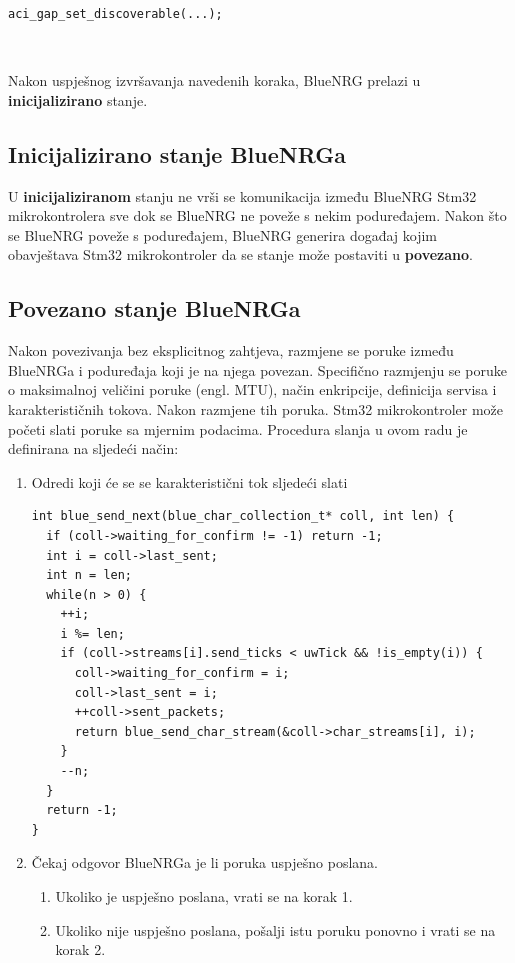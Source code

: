 \documentclass[times, utf8, diplomski]{diplomski}
\begin{document}
\begin{lstlisting}[caption={Postavi stanje BlueNRGa u stanje u povezivo stanje}, label={lastinit}]
aci_gap_set_discoverable(...);
\end{lstlisting}
\ \

Nakon uspješnog izvršavanja navedenih koraka, BlueNRG prelazi u \textbf{inicijalizirano} stanje.

\subsection{Inicijalizirano stanje BlueNRGa}
U \textbf{inicijaliziranom} stanju ne vrši se komunikacija između BlueNRG Stm32 mikrokontrolera sve dok se BlueNRG ne poveže s nekim poduređajem. Nakon što se BlueNRG poveže s poduređajem, BlueNRG generira događaj kojim obavještava Stm32 mikrokontroler da se stanje može postaviti u \textbf{povezano}.

\subsection{Povezano stanje BlueNRGa}
Nakon povezivanja bez eksplicitnog zahtjeva, razmjene se poruke između BlueNRGa i poduređaja koji je na njega povezan. Specifično razmjenju se poruke o maksimalnoj veličini poruke (engl. MTU), način enkripcije, definicija servisa i karakterističnih tokova. Nakon razmjene tih poruka. Stm32 mikrokontroler može početi slati poruke sa mjernim podacima. Procedura slanja u ovom radu je definirana na sljedeći način:

\begin{enumerate}
  \item Odredi koji će se se karakteristični tok sljedeći slati
\begin{lstlisting}[caption = {Procedura za odabir karakterističnog toka koji će sljedeći biti poslan}]
int blue_send_next(blue_char_collection_t* coll, int len) {
  if (coll->waiting_for_confirm != -1) return -1;
  int i = coll->last_sent;
  int n = len;
  while(n > 0) {
    ++i;
    i %= len;
    if (coll->streams[i].send_ticks < uwTick && !is_empty(i)) {
      coll->waiting_for_confirm = i;
      coll->last_sent = i;
      ++coll->sent_packets;
      return blue_send_char_stream(&coll->char_streams[i], i);
    }
    --n;
  }
  return -1;
}
\end{lstlisting}
  \item Čekaj odgovor BlueNRGa je li poruka uspješno poslana.
    \begin{enumerate}
      \item Ukoliko je uspješno poslana, vrati se na korak 1.
      \item Ukoliko nije uspješno poslana, pošalji istu poruku ponovno i vrati se na korak 2.
    \end{enumerate}
\end{enumerate}
\end{document}

